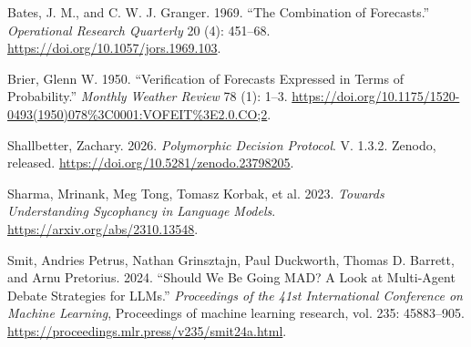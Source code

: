 \documentclass[
  english,
]{article}
\newlength{\cslhangindent}
\newenvironment{CSLReferences}[2] %
 {\begin{list}{}{%
  \setlength{\itemindent}{0pt}
  \setlength{\leftmargin}{0pt}
  \setlength{\parsep}{0pt}
  \ifodd #1
   \setlength{\leftmargin}{\cslhangindent}
   \setlength{\itemindent}{-1\cslhangindent}
  \fi
  \setlength{\itemsep}{#2\baselineskip}}}
 {\end{list}}
\begin{document}
\protect{}\label{refs}
\begin{CSLReferences}{1}{1}
Bates, J. M., and C. W. J. Granger. 1969. {``The Combination of
Forecasts.''} \emph{Operational Research Quarterly} 20 (4): 451--68.
\url{https://doi.org/10.1057/jors.1969.103}.

Brier, Glenn W. 1950. {``Verification of Forecasts Expressed in Terms of
Probability.''} \emph{Monthly Weather Review} 78 (1): 1--3.
\url{https://doi.org/10.1175/1520-0493(1950)078\%3C0001:VOFEIT\%3E2.0.CO;2}.

Shallbetter, Zachary. 2026. \emph{Polymorphic Decision Protocol}. V.
1.3.2. Zenodo, released. \url{https://doi.org/10.5281/zenodo.23798205}.

{Sharma, Mrinank, Meg Tong, Tomasz Korbak, et al.} 2023. \emph{Towards
Understanding Sycophancy in Language Models}.
\url{https://arxiv.org/abs/2310.13548}.

Smit, Andries Petrus, Nathan Grinsztajn, Paul Duckworth, Thomas D.
Barrett, and Arnu Pretorius. 2024. {``Should We Be Going MAD? A Look at
Multi-Agent Debate Strategies for LLMs.''} \emph{Proceedings of the 41st
International Conference on Machine Learning}, Proceedings of machine
learning research, vol. 235: 45883--905.
\url{https://proceedings.mlr.press/v235/smit24a.html}.

\end{CSLReferences}
\end{document}
